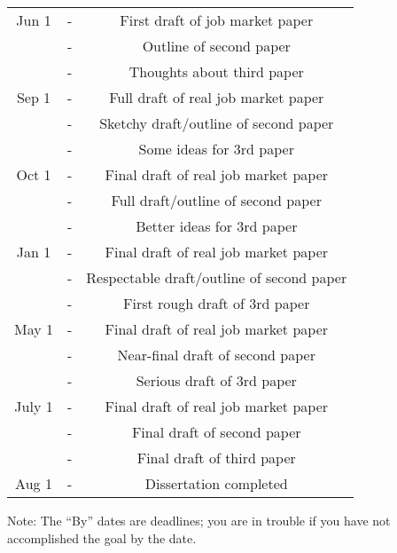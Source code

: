 \documentclass{\classes/econtex}
\begin{document}
\begin{center}
\begin{tabular}{|ccc|}\hline
     Jun 1 & - & First draft of job market paper
\\       & - & Outline of second paper
\\       & - & Thoughts about third paper
\\   Sep 1 & - & Full draft of real job market paper
\\     & - & Sketchy draft/outline of second paper
\\     & - & Some ideas for 3rd paper
\\ Oct 1 & - & Final draft of real job market paper
\\     & - & Full draft/outline of second paper
\\     & - & Better ideas for 3rd paper
\\ Jan 1 & - & Final draft of real job market paper
\\     & - & Respectable draft/outline of second paper
\\     & - & First rough draft of 3rd paper
\\ May 1 & - & Final draft of real job market paper
\\     & - & Near-final draft of second paper
\\     & - & Serious draft of 3rd paper
\\ July 1 & - & Final draft of real job market paper
\\     & - & Final draft of second paper
\\     & - & Final draft of third paper
\\ Aug 1 & - & Dissertation completed
\\ \hline 
\end{tabular}
\end{center}



Note: The ``By'' dates are deadlines; you are in trouble if you have not
accomplished the goal by the date.
\end{document}

